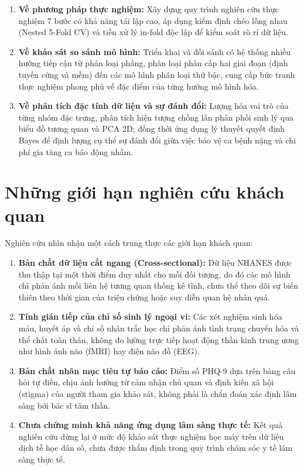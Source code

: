 \begin{enumerate}
    \item \textbf{Về phương pháp thực nghiệm:} Xây dựng quy trình nghiên cứu thực nghiệm 7 bước có khả năng tái lập cao, áp dụng kiểm định chéo lồng nhau (Nested 5-Fold CV) và tiền xử lý in-fold độc lập để kiểm soát rò rỉ dữ liệu.
    \item \textbf{Về khảo sát so sánh mô hình:} Triển khai và đối sánh có hệ thống nhiều hướng tiếp cận từ phân loại phẳng, phân loại phân cấp hai giai đoạn (định tuyến cứng và mềm) đến các mô hình phân loại thứ bậc, cung cấp bức tranh thực nghiệm phong phú về đặc điểm của từng hướng mô hình hóa.
    \item \textbf{Về phân tích đặc tính dữ liệu và sự đánh đổi:} Lượng hóa vai trò của từng nhóm đặc trưng, phân tích hiện tượng chồng lấn phân phối sinh lý qua biểu đồ tương quan và PCA 2D; đồng thời ứng dụng lý thuyết quyết định Bayes để định lượng cụ thể sự đánh đổi giữa việc bảo vệ ca bệnh nặng và chi phí gia tăng ca báo động nhầm.
\end{enumerate}

\section{Những giới hạn nghiên cứu khách quan}
\label{sec:han-che-nghien-cuu}

Nghiên cứu nhìn nhận một cách trung thực các giới hạn khách quan:
\begin{enumerate}
    \item \textbf{Bản chất dữ liệu cắt ngang (Cross-sectional):} Dữ liệu NHANES được thu thập tại một thời điểm duy nhất cho mỗi đối tượng, do đó các mô hình chỉ phản ánh mối liên hệ tương quan thống kê tĩnh, chưa thể theo dõi sự biến thiên theo thời gian của triệu chứng hoặc suy diễn quan hệ nhân quả.
    \item \textbf{Tính gián tiếp của chỉ số sinh lý ngoại vi:} Các xét nghiệm sinh hóa máu, huyết áp và chỉ số nhân trắc học chỉ phản ánh tình trạng chuyển hóa và thể chất toàn thân, không đo lường trực tiếp hoạt động thần kinh trung ương như hình ảnh não (fMRI) hay điện não đồ (EEG).
    \item \textbf{Bản chất nhãn mục tiêu tự báo cáo:} Điểm số PHQ-9 dựa trên bảng câu hỏi tự điền, chịu ảnh hưởng từ cảm nhận chủ quan và định kiến xã hội (stigma) của người tham gia khảo sát, không phải là chẩn đoán xác định lâm sàng bởi bác sĩ tâm thần.
    \item \textbf{Chưa chứng minh khả năng ứng dụng lâm sàng thực tế:} Kết quả nghiên cứu dừng lại ở mức độ khảo sát thực nghiệm học máy trên dữ liệu dịch tễ học dân số, chưa được thẩm định trong quy trình chăm sóc y tế lâm sàng thực tế.
\end{enumerate}

